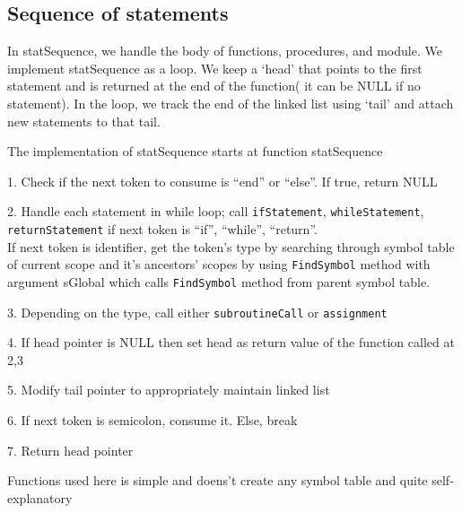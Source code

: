 \documentclass[12pt]{article}
\begin{document}
\subsection{Sequence of statements}

In statSequence, we handle the body of functions, procedures, and module. We implement statSequence as a loop.
We keep a ‘head’ that points to the first statement and is returned at the end of the function( it can be NULL if no statement).
In the loop, we track the end of the linked list using ‘tail’ and attach new statements to that tail.
\begin{MyIndentedList}
    \item The implementation of statSequence starts at function statSequence
    \begin{MyIndentedList}
        \item 1. Check if the next token to consume is “end” or “else”. If true, return NULL
        \item 2. Handle each statement in while loop; call \texttt{ifStatement}, \texttt{whileStatement}, \texttt{returnStatement} if next token is “if”, “while”, “return”.\\
        If next token is identifier, get the token’s type by searching through symbol table of current scope and it’s ancestors’ scopes by using \texttt{FindSymbol} method with argument sGlobal which calls \texttt{FindSymbol} method from parent symbol table.
        \item 3. Depending on the type, call either \texttt{subroutineCall} or \texttt{assignment} 
        \item 4. If head pointer is NULL then set head as return value of the function called at 2,3
        \item 5. Modify tail pointer to appropriately maintain linked list
        \item 6. If next token is semicolon, consume it. Else, break
        \item 7. Return head pointer                
    \end{MyIndentedList}
\end{MyIndentedList}
Functions used here is simple and doens’t create any symbol table and quite self-explanatory
\end{document}
